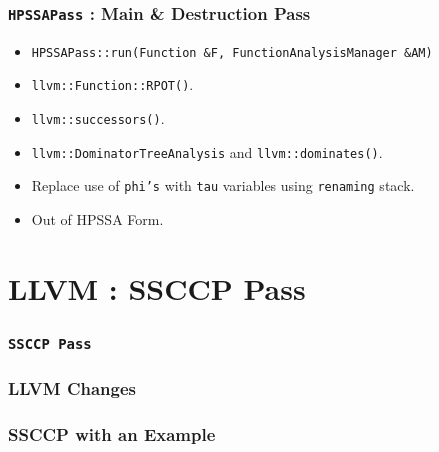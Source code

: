 \documentclass{beamer}
\begin{document}
\begin{frame}
	\frametitle{\texttt{HPSSAPass} : Main \& Destruction Pass}
	\begin{itemize}
		\item \texttt{HPSSAPass::run(Function \&F, FunctionAnalysisManager \&AM)} 
		\item \texttt{llvm::Function::RPOT()}.
		\item \texttt{llvm::successors()}.
		\item \texttt{llvm::DominatorTreeAnalysis} and \texttt{llvm::dominates()}.
		\item Replace use of \texttt{phi's} with \texttt{tau} variables using \texttt{renaming} stack.
		\item Out of HPSSA Form. 
	\end{itemize}
\end{frame}

\section{LLVM : SSCCP Pass}

\begin{frame}
	\frametitle{\texttt{SSCCP Pass}}

\end{frame}

\begin{frame}
	\frametitle{LLVM Changes}

\end{frame}


\begin{frame}
	\frametitle{SSCCP with an Example}
	
\end{frame}
\end{document}
